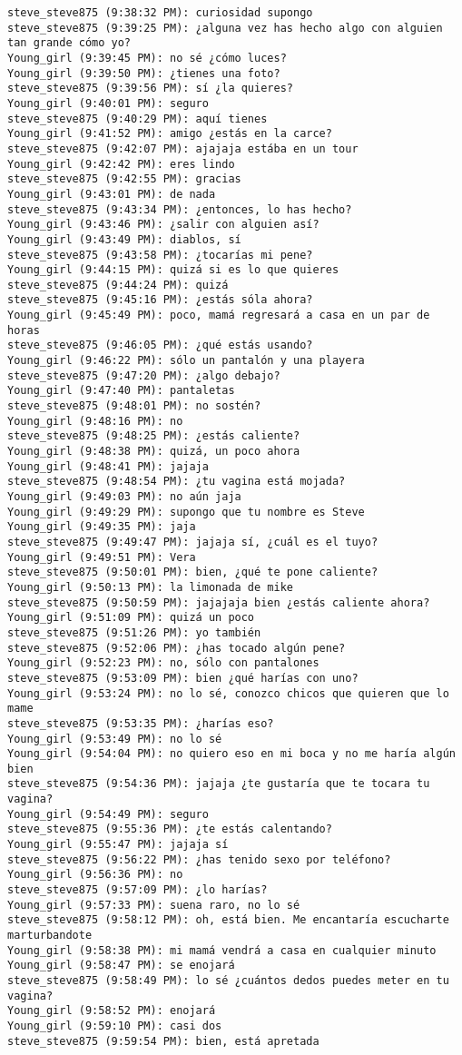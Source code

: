 \begin{verbatim}
steve_steve875 (9:38:32 PM): curiosidad supongo
steve_steve875 (9:39:25 PM): ¿alguna vez has hecho algo con alguien tan grande cómo yo?
Young_girl (9:39:45 PM): no sé ¿cómo luces?
Young_girl (9:39:50 PM): ¿tienes una foto?
steve_steve875 (9:39:56 PM): sí ¿la quieres?
Young_girl (9:40:01 PM): seguro
steve_steve875 (9:40:29 PM): aquí tienes
Young_girl (9:41:52 PM): amigo ¿estás en la carce?
steve_steve875 (9:42:07 PM): ajajaja estába en un tour
Young_girl (9:42:42 PM): eres lindo
steve_steve875 (9:42:55 PM): gracias
Young_girl (9:43:01 PM): de nada
steve_steve875 (9:43:34 PM): ¿entonces, lo has hecho?
Young_girl (9:43:46 PM): ¿salir con alguien así?
Young_girl (9:43:49 PM): diablos, sí
steve_steve875 (9:43:58 PM): ¿tocarías mi pene?
Young_girl (9:44:15 PM): quizá si es lo que quieres
steve_steve875 (9:44:24 PM): quizá
steve_steve875 (9:45:16 PM): ¿estás sóla ahora?
Young_girl (9:45:49 PM): poco, mamá regresará a casa en un par de horas
steve_steve875 (9:46:05 PM): ¿qué estás usando?
Young_girl (9:46:22 PM): sólo un pantalón y una playera
steve_steve875 (9:47:20 PM): ¿algo debajo?
Young_girl (9:47:40 PM): pantaletas
steve_steve875 (9:48:01 PM): no sostén?
Young_girl (9:48:16 PM): no
steve_steve875 (9:48:25 PM): ¿estás caliente?
Young_girl (9:48:38 PM): quizá, un poco ahora
Young_girl (9:48:41 PM): jajaja
steve_steve875 (9:48:54 PM): ¿tu vagina está mojada?
Young_girl (9:49:03 PM): no aún jaja
Young_girl (9:49:29 PM): supongo que tu nombre es Steve
Young_girl (9:49:35 PM): jaja
steve_steve875 (9:49:47 PM): jajaja sí, ¿cuál es el tuyo?
Young_girl (9:49:51 PM): Vera
steve_steve875 (9:50:01 PM): bien, ¿qué te pone caliente?
Young_girl (9:50:13 PM): la limonada de mike
steve_steve875 (9:50:59 PM): jajajaja bien ¿estás caliente ahora?
Young_girl (9:51:09 PM): quizá un poco
steve_steve875 (9:51:26 PM): yo también
steve_steve875 (9:52:06 PM): ¿has tocado algún pene?
Young_girl (9:52:23 PM): no, sólo con pantalones
steve_steve875 (9:53:09 PM): bien ¿qué harías con uno?
Young_girl (9:53:24 PM): no lo sé, conozco chicos que quieren que lo mame
steve_steve875 (9:53:35 PM): ¿harías eso?
Young_girl (9:53:49 PM): no lo sé
Young_girl (9:54:04 PM): no quiero eso en mi boca y no me haría algún bien
steve_steve875 (9:54:36 PM): jajaja ¿te gustaría que te tocara tu vagina?
Young_girl (9:54:49 PM): seguro
steve_steve875 (9:55:36 PM): ¿te estás calentando?
Young_girl (9:55:47 PM): jajaja sí
steve_steve875 (9:56:22 PM): ¿has tenido sexo por teléfono?
Young_girl (9:56:36 PM): no
steve_steve875 (9:57:09 PM): ¿lo harías?
Young_girl (9:57:33 PM): suena raro, no lo sé
steve_steve875 (9:58:12 PM): oh, está bien. Me encantaría escucharte marturbandote
Young_girl (9:58:38 PM): mi mamá vendrá a casa en cualquier minuto
Young_girl (9:58:47 PM): se enojará
steve_steve875 (9:58:49 PM): lo sé ¿cuántos dedos puedes meter en tu vagina?
Young_girl (9:58:52 PM): enojará
Young_girl (9:59:10 PM): casi dos
steve_steve875 (9:59:54 PM): bien, está apretada

\end{verbatim}